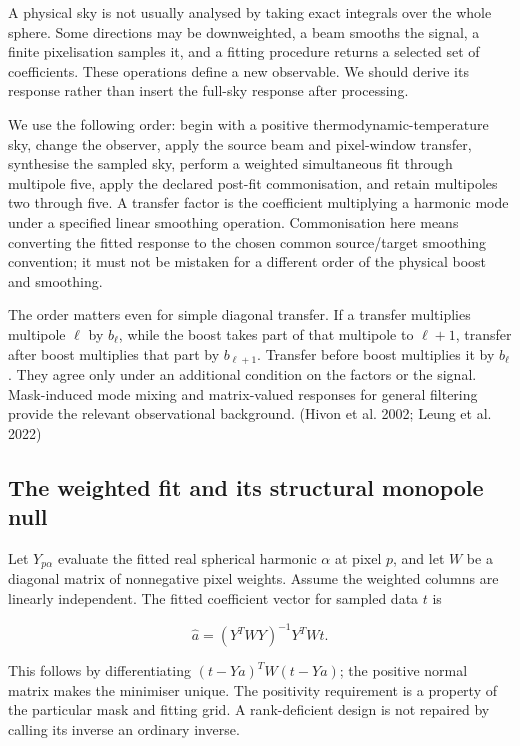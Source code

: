 \documentclass[
  11pt,
  a4paper]{article}
\begin{document}
A physical sky is not usually analysed by taking exact integrals over the whole sphere. Some directions may be downweighted, a beam smooths the signal, a finite pixelisation samples it, and a fitting procedure returns a selected set of coefficients. These operations define a new observable. We should derive its response rather than insert the full-sky response after processing.

We use the following order: begin with a positive thermodynamic-temperature sky, change the observer, apply the source beam and pixel-window transfer, synthesise the sampled sky, perform a weighted simultaneous fit through multipole five, apply the declared post-fit commonisation, and retain multipoles two through five. A transfer factor is the coefficient multiplying a harmonic mode under a specified linear smoothing operation. Commonisation here means converting the fitted response to the chosen common source/target smoothing convention; it must not be mistaken for a different order of the physical boost and smoothing.

The order matters even for simple diagonal transfer. If a transfer multiplies multipole \(\ell\) by \(b_\ell\), while the boost takes part of that multipole to \(\ell+1\), transfer after boost multiplies that part by \(b_{\ell+1}\). Transfer before boost multiplies it by \(b_\ell\). They agree only under an additional condition on the factors or the signal. Mask-induced mode mixing and matrix-valued responses for general filtering provide the relevant observational background. (Hivon et al. 2002; Leung et al. 2022)

\hypertarget{the-weighted-fit-and-its-structural-monopole-null}{%
\subsection{The weighted fit and its structural monopole null}\label{the-weighted-fit-and-its-structural-monopole-null}}

Let \(Y_{p\alpha}\) evaluate the fitted real spherical harmonic \(\alpha\) at pixel \(p\), and let \(W\) be a diagonal matrix of nonnegative pixel weights. Assume the weighted columns are linearly independent. The fitted coefficient vector for sampled data \(t\) is

\[
\widehat a=(Y^TWY)^{-1}Y^TWt.
\tag{10.1}
\]

This follows by differentiating \((t-Ya)^TW(t-Ya)\); the positive normal matrix makes the minimiser unique. The positivity requirement is a property of the particular mask and fitting grid. A rank-deficient design is not repaired by calling its inverse an ordinary inverse.
\end{document}
